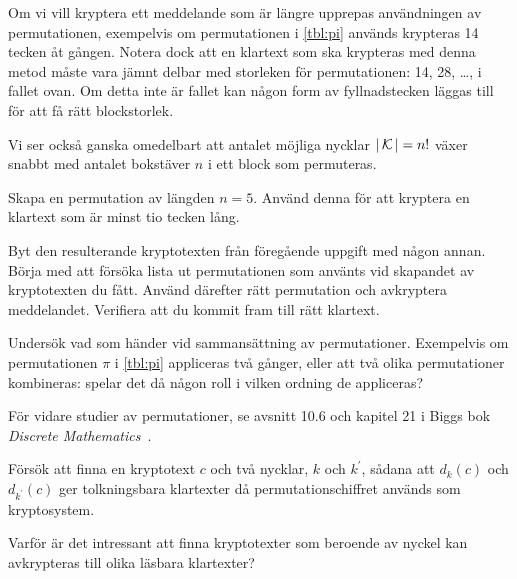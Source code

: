 Om vi vill kryptera ett meddelande som är längre upprepas användningen av 
permutationen, exempelvis om permutationen i \cref{tbl:pi} används 
krypteras 14 tecken åt gången.
Notera dock att en klartext som ska krypteras med denna metod måste vara jämnt 
delbar med storleken för permutationen: 14, 28, \dots, i fallet ovan.
Om detta inte är fallet kan någon form av fyllnadstecken läggas till för att få 
rätt blockstorlek.

Vi ser också ganska omedelbart att antalet möjliga nycklar \(|\operatorname{\mathcal{K}}| = {n!}\) 
växer snabbt med antalet bokstäver \(n\) i ett block som permuteras.

\begin{exercise}
  Skapa en permutation av längden \(n = 5\).
  Använd denna för att kryptera en klartext som är minst tio tecken lång.
\end{exercise}
\begin{exercise}
  Byt den resulterande kryptotexten från föregående uppgift med någon annan.
  Börja med att försöka lista ut permutationen som använts vid skapandet av 
  kryptotexten du fått.
  Använd därefter rätt permutation och avkryptera meddelandet.
  Verifiera att du kommit fram till rätt klartext.
\end{exercise}
\begin{exercise}
  Undersök vad som händer vid sammansättning av permutationer.
  Exempelvis om permutationen \(\pi\) i \cref{tbl:pi} appliceras två 
  gånger, eller att två olika permutationer kombineras: spelar det då någon 
  roll i vilken ordning de appliceras?
\end{exercise}

För vidare studier av permutationer, se avsnitt 10.6 och kapitel 21 i Biggs bok 
\emph{Discrete Mathematics}~\cite{Biggs2002dm}.

\begin{exercise}
  Försök att finna en kryptotext \(c\) och två nycklar, \(k\) och \(k^\prime\), 
  sådana att \(d_k(c)\) och \(d_{k^\prime}(c)\) ger tolkningsbara klartexter då 
  permutationschiffret används som kryptosystem.
\end{exercise}
\begin{exercise}
  Varför är det intressant att finna kryptotexter som beroende av nyckel kan 
  avkrypteras till olika läsbara klartexter?
\end{exercise}

